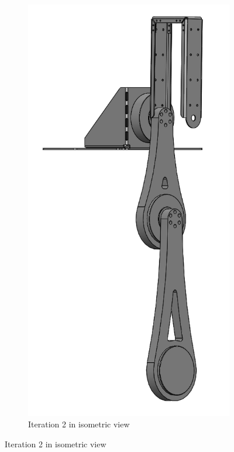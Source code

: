 \begin{figure}[H]
    \begin{subfigure}[b]{0.3\textwidth}
        \includegraphics[width=\textwidth]{figures/hardware_setup/double_pendulum_it2_v1.png}
        \caption{Iteration 2 in isometric view}

\end{subfigure}
\end{figure}
